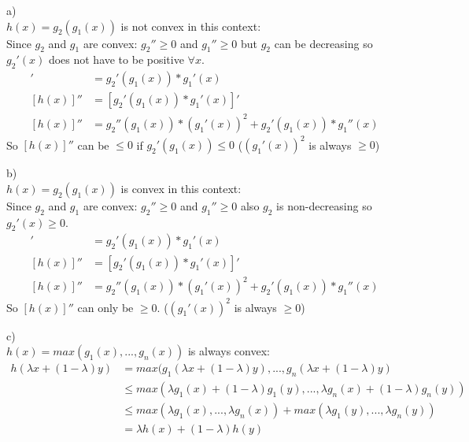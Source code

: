 %
%
%
\begin{flushleft}
a)\\
$h(x)=g_2(g_1(x))$ is not convex in this context:\\
Since $g_2$ and $g_1$ are convex: $g_2''\geq0$ and $g_1''\geq0$ but $g_2$ can 
be decreasing so $g_2'(x)$ does not have to be positive $\forall x$.
\begin{align*}
[h(x)]' &= g_2'(g_1(x))*g_1'(x)\\
[h(x)]'' &= [g_2'(g_1(x))*g_1'(x)]'\\
[h(x)]'' &= g_2''(g_1(x))*(g_1'(x))^2 + g_2'(g_1(x))*g_1''(x)
\end{align*}
So $[h(x)]''$ can be $\leq 0$ if $g_2'(g_1(x)) \leq 0$ ($(g_1'(x))^2$ is 
always $\geq 0$)
\end{flushleft}
\begin{flushleft}
b)\\
$h(x)=g_2(g_1(x))$ is convex in this context:\\
Since $g_2$ and $g_1$ are convex: $g_2''\geq0$ and $g_1''\geq0$ also $g_2$ is 
non-decreasing so $g_2'(x) \geq 0$.
\begin{align*}
[h(x)]' &= g_2'(g_1(x))*g_1'(x)\\
[h(x)]'' &= [g_2'(g_1(x))*g_1'(x)]'\\
[h(x)]'' &= g_2''(g_1(x))*(g_1'(x))^2 + g_2'(g_1(x))*g_1''(x)
\end{align*}
So $[h(x)]''$ can only be $\geq 0$. ($(g_1'(x))^2$ is always $\geq 0$)
\end{flushleft}
\begin{flushleft}
c)\\
$h(x)=max(g_1(x),...,g_n(x))$ is always convex:\\
\begin{align*}
h(\lambda x+ (1- \lambda)y) &= max(g_1(\lambda x+ (1- \lambda)y), ... , 
g_n(\lambda x+ (1- \lambda)y)\\
&\leq max(\lambda g_1(x) + (1-\lambda)g_1(y),...,\lambda g_n(x) + (1-\lambda)g_n(y))\\
&\leq max(\lambda g_1(x), ... , \lambda g_n(x)) + max(\lambda g_1(y), ... , \lambda g_n(y))\\
&= \lambda h(x) + (1-\lambda)h(y)
\end{align*}
\end{flushleft}
%
%
%

%
%
%
%
%
%




